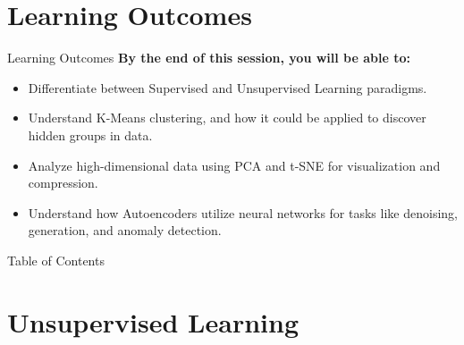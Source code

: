\section{Learning Outcomes}
\begin{frame}{Learning Outcomes}
\textbf{By the end of this session, you will be able to:}

\vspace{1em}
\begin{itemize}\setlength\itemsep{1em}
    \item Differentiate between Supervised and Unsupervised Learning paradigms.
    \item Understand K-Means clustering, and how it could be applied to discover hidden groups in data.
    \item Analyze high-dimensional data using PCA and t-SNE for visualization and compression.
    \item Understand how Autoencoders utilize neural networks for tasks like denoising, generation, and anomaly detection.
\end{itemize}

\end{frame}

\begin{frame}{Table of Contents}
    \tableofcontents
\end{frame}


\section{Unsupervised Learning}

